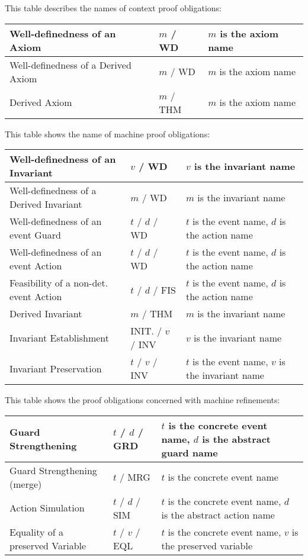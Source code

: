 This table describes the names of context proof obligations: 

\begin{center}
    \begin{tabular}{| p{6cm} | p{3cm} | p{5cm} |}
    \hline
	Well-definedness of an Axiom & $m$ / WD & $m$ is the axiom name\\ \hline
	Well-definedness of a Derived Axiom & $m$  / WD & $m$ is the axiom name \\ \hline
	Derived Axiom & $m$  / THM & $m$ is the axiom name \\ \hline
    \end{tabular}
\end{center}

This table shows the name of machine proof obligations:

\begin{center}
    \begin{tabular}{| p{6cm} | p{3cm} | p{5cm} |}
    \hline
	Well-definedness of an Invariant & $v$  / WD & $v$ is the invariant name\\ \hline
	Well-definedness of a Derived Invariant & $m$  / WD & $m$ is the invariant name \\ \hline
	Well-definedness of an event Guard & $t$  / $d$  / WD & $t$ is the event name, $d$ is the action name  \\ \hline
	Well-definedness of an event Action & $t$  / $d$  / WD & $t$ is the event name, $d$ is the action name  \\ \hline
	Feasibility of a non-det. event Action & $t$  / $d$  / FIS & $t$ is the event name, $d$ is the action name  \\ \hline
	Derived Invariant & $m$ / THM & $m$ is the invariant name \\ \hline
	Invariant Establishment & INIT.  / $v$  / INV & $v$ is the invariant name  \\ \hline
	Invariant Preservation & $t$  / $v$  / INV & $t$ is the event name, $v$ is the invariant name  \\ \hline
    \end{tabular}
\end{center}

This table shows the proof obligations concerned with machine refinements:

\begin{center}
    \begin{tabular}{| p{6cm} | p{3cm} | p{5cm} |}
    \hline
	Guard Strengthening & $t$  / $d$  / GRD & $t$ is the concrete event name, $d$ is the abstract guard name\\ \hline
	Guard Strengthening (merge) & $t$  / MRG & $t$ is the concrete event name \\ \hline
	Action Simulation & $t$  / $d$  / SIM & $t$ is the concrete event name, $d$ is the abstract action name  \\ \hline
	Equality of a preserved Variable & $t$  / $v$  / EQL & $t$ is the concrete event name, $v$ is the preserved variable  \\ \hline
    \end{tabular}
\end{center}

